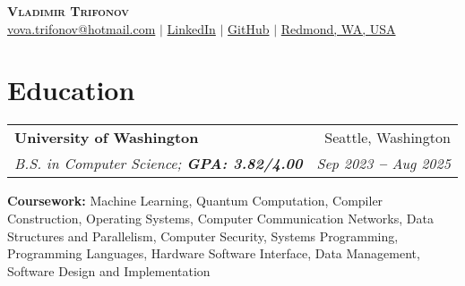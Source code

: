 \documentclass[letterpaper,11pt]{article}
\makeatletter
\newcommand{\resumeEducationHeading}[4]{
  \vspace{-2pt}\item
    \begin{tabular*}{0.97\textwidth}[t]{l@{\extracolsep{\fill}}r}
      \textbf{#1} & #2 \\
      \textit{\small#3} & \textit{\small #4} \\
    \end{tabular*}\vspace{-5pt}
}
\newcommand{\resumeSubHeadingListStart}{\begin{itemize}[leftmargin=0.15in, label={}]}
\newcommand{\resumeSubHeadingListEnd}{\end{itemize}}
\makeatother
\begin{document}

\begin{center}
    \textbf{\Huge \scshape Vladimir Trifonov} \\ \vspace{3pt}
    \small
    \faEnvelope \hspace{.5pt} \href{mailto:vova.trifonov@hotmail.com}{\color{blue}vova.trifonov@hotmail.com}
    $|$
    \faLinkedinSquare \hspace{.5pt} \href{https://www.linkedin.com/in/vladimir-trifonov-a06284220/}{\color{blue}LinkedIn}
    $|$
    \faGithub \hspace{.5pt} \href{https://github.com/Vladimirtrif}{\color{blue}GitHub}
    $|$
    \faMapMarker \hspace{.5pt} \href{https://maps.app.goo.gl/JGq95Uiw7m12e89E8}{\color{blue}Redmond, WA, USA}
\end{center}




\section{Education}
  \vspace{3pt}
  \resumeSubHeadingListStart
    
    \resumeEducationHeading
      {University of Washington} {Seattle, Washington}
      {B.S. in Computer Science;   \textbf{GPA: 3.82/4.00}} {Sep 2023 \textbf{--} Aug 2025}
        \resumeSubHeadingListStart
        \small{\item{
             \textbf{Coursework:} Machine Learning, Quantum Computation,
             Compiler Construction, Operating Systems, Computer Communication Networks,
             Data Structures and Parallelism, Computer Security, Systems Programming,
             Programming Languages, Hardware Software Interface, Data Management,
             Software Design and Implementation}}
        \resumeSubHeadingListEnd
  \resumeSubHeadingListEnd



\end{document}
